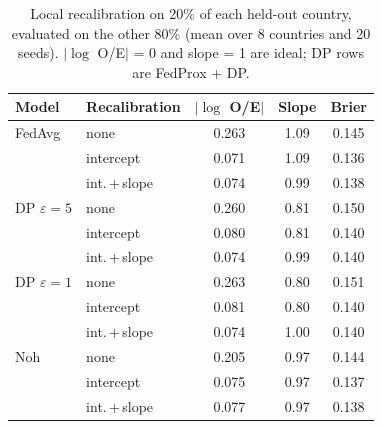 \begin{table}[t]
\caption{Local recalibration on 20\% of each held-out country, evaluated on the other 80\% (mean over 8 countries and 20 seeds). $|\log$ O/E$|$ = 0 and slope = 1 are ideal; DP rows are FedProx + DP.}
\centering\scriptsize
\setlength{\tabcolsep}{4pt}
\begin{tabular}{llccc}
\toprule
Model & Recalibration & $|\log$ O/E$|$ & Slope & Brier \\
\midrule
FedAvg & none & 0.263 & 1.09 & 0.145 \\
 & intercept & 0.071 & 1.09 & 0.136 \\
 & int.\,+\,slope & 0.074 & 0.99 & 0.138 \\
\midrule
DP $\varepsilon=5$ & none & 0.260 & 0.81 & 0.150 \\
 & intercept & 0.080 & 0.81 & 0.140 \\
 & int.\,+\,slope & 0.074 & 0.99 & 0.140 \\
\midrule
DP $\varepsilon=1$ & none & 0.263 & 0.80 & 0.151 \\
 & intercept & 0.081 & 0.80 & 0.140 \\
 & int.\,+\,slope & 0.074 & 1.00 & 0.140 \\
\midrule
Noh & none & 0.205 & 0.97 & 0.144 \\
 & intercept & 0.075 & 0.97 & 0.137 \\
 & int.\,+\,slope & 0.077 & 0.97 & 0.138 \\
\bottomrule
\end{tabular}
\label{tab:pca19_recal}
\end{table}
